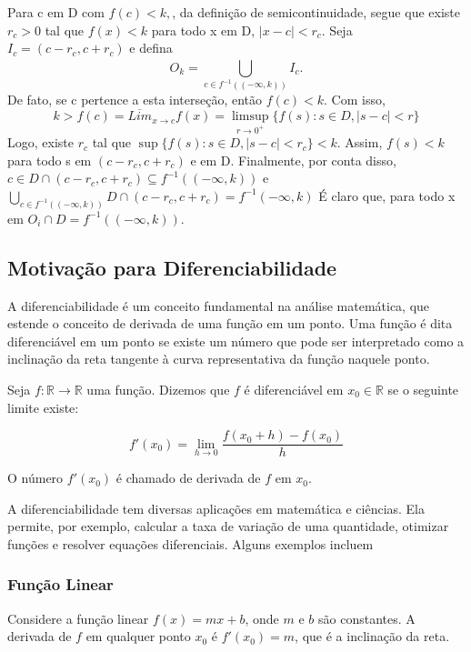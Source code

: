 \documentclass[Analysis/analysis_notes.tex]{subfiles}
\begin{document}
\begin{proof*}
	Para c em D com \(f(c) < k,\), da defini\c cão de semicontinuidade, segue que
	existe \(r_{c}>0\) tal que \(f(x) < k\) para todo x em D, \(|x-c| < r_{c}.\) Seja
	\(I_{c} = (c-r_{c}, c+r_{c})\) e defina
	\[
		O_{k} = \bigcup_{c\in f^{-1}((-\infty, k))}^{}{I_{c}.}
	\]
	De fato, se c pertence a esta interse\c cão, então \(f(c) < k\). Com isso,
	\[
		k > f(c) = \overline{Lim}_{x\to c}f(x) = \limsup_{r\to 0^{+}}\{f(s):s\in D, |s-c|< r\}
	\]
	Logo, existe \(r_{c}\) tal que \(\sup\{f(s):s\in D, |s-c|<r_{c}\} < k.\) Assim,
	\(f(s)<k\) para todo s em \((c-r_{c}, c+r_{c})\) e em D. Finalmente, por conta disso,
	\(c\in D\cap(c-r_{c}, c+r_{c})\subseteq{f^{-1}((-\infty, k))}\) e \(\bigcup_{c\in f^{-1}((-\infty, k))}^{}{D\cap (c-r_{c}, c+r_{c})} = f^{-1}(-\infty, k)\)
	É claro que, para todo x em \(O_{i}\cap D = f^{-1}((-\infty, k))\).
\end{proof*}

\subsection{Motiva\c cão para Diferenciabilidade}
A diferenciabilidade é um conceito fundamental na análise matemática, que
estende o conceito de derivada de uma função em um ponto. Uma função é dita
diferenciável em um ponto se existe um número que pode ser interpretado como
a inclinação da reta tangente à curva representativa da função naquele ponto.

Seja $f: \mathbb{R} \to \mathbb{R}$ uma função. Dizemos que $f$ é
diferenciável em $x_0 \in \mathbb{R}$ se o seguinte limite existe:

\begin{equation}
	f'(x_0) = \lim_{{h \to 0}} \frac{f(x_0 + h) - f(x_0)}{h}
\end{equation}

O número $f'(x_0)$ é chamado de derivada de $f$ em $x_0$.

A diferenciabilidade tem diversas aplicações em matemática e ciências.
Ela permite, por exemplo, calcular a taxa de variação de uma quantidade,
otimizar funções e resolver equações diferenciais. Alguns exemplos incluem

\subsubsection{Função Linear}

Considere a função linear $f(x) = mx + b$, onde $m$ e $b$ são constantes. A derivada de $f$ em qualquer ponto $x_0$ é $f'(x_0) = m$, que é a inclinação da reta.
\end{document}
